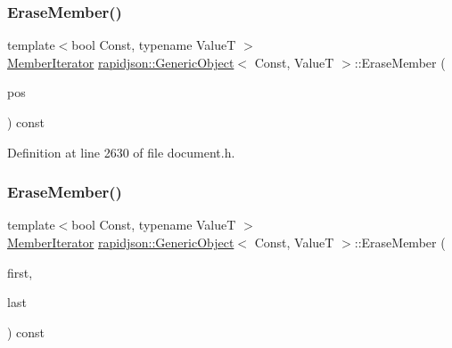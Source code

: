 \subsubsection{\texorpdfstring{EraseMember()}{EraseMember()}\hspace{0.1cm}{\footnotesize\ttfamily [1/4]}}
{\footnotesize\ttfamily template$<$bool Const, typename ValueT $>$ \\
\mbox{\hyperlink{classrapidjson_1_1_generic_object_a598fd1d5f55289eca275847f0e8ef295}{Member\+Iterator}} \mbox{\hyperlink{classrapidjson_1_1_generic_object}{rapidjson\+::\+Generic\+Object}}$<$ Const, ValueT $>$\+::Erase\+Member (\begin{DoxyParamCaption}\item[{\mbox{\hyperlink{classrapidjson_1_1_generic_object_a579a7d7ab7102bcf86c948d0df3d2f2d}{Const\+Member\+Iterator}}}]{pos }\end{DoxyParamCaption}) const}



Definition at line 2630 of file document.\+h.


\begin{DoxyCode}{0}

\end{DoxyCode}
\mbox{\label{classrapidjson_1_1_generic_object_af5d1661531777782d90249fe5ee748cb}} 
\subsubsection{\texorpdfstring{EraseMember()}{EraseMember()}\hspace{0.1cm}{\footnotesize\ttfamily [2/4]}}
{\footnotesize\ttfamily template$<$bool Const, typename ValueT $>$ \\
\mbox{\hyperlink{classrapidjson_1_1_generic_object_a598fd1d5f55289eca275847f0e8ef295}{Member\+Iterator}} \mbox{\hyperlink{classrapidjson_1_1_generic_object}{rapidjson\+::\+Generic\+Object}}$<$ Const, ValueT $>$\+::Erase\+Member (\begin{DoxyParamCaption}\item[{\mbox{\hyperlink{classrapidjson_1_1_generic_object_a579a7d7ab7102bcf86c948d0df3d2f2d}{Const\+Member\+Iterator}}}]{first,  }\item[{\mbox{\hyperlink{classrapidjson_1_1_generic_object_a579a7d7ab7102bcf86c948d0df3d2f2d}{Const\+Member\+Iterator}}}]{last }\end{DoxyParamCaption}) const}



